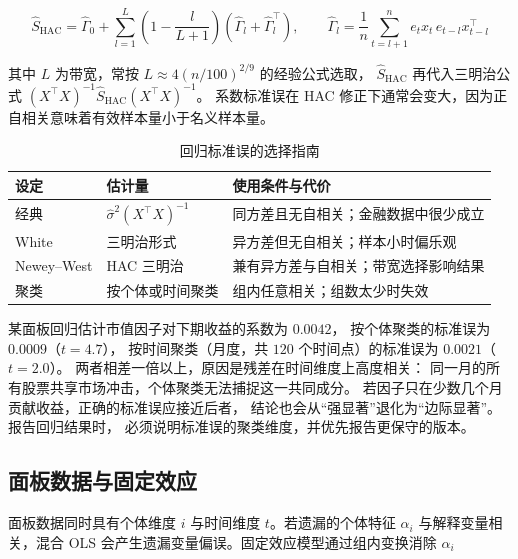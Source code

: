 \begin{equation}
  \hat{S}_{\text{HAC}} = \hat{\Gamma}_0 + \sum_{l=1}^{L}
  \left(1 - \frac{l}{L+1}\right)\left(\hat{\Gamma}_l + \hat{\Gamma}_l^{\top}\right),
  \qquad \hat{\Gamma}_l = \frac{1}{n}\sum_{t=l+1}^{n} e_t x_t\, e_{t-l} x_{t-l}^{\top}
  \label{eq:08-hac}
\end{equation}

其中 $L$ 为带宽，常按 $L \approx 4(n/100)^{2/9}$ 的经验公式选取，
$\hat{S}_{\text{HAC}}$ 再代入三明治公式
$(X^{\top}X)^{-1}\hat{S}_{\text{HAC}}(X^{\top}X)^{-1}$。
系数标准误在 HAC 修正下通常会变大，因为正自相关意味着有效样本量小于名义样本量。

\begin{table}[htbp]
\centering
\caption{回归标准误的选择指南}\label{tab:08-se}
\tablefont
\begin{tabular}{@{}llL{5.4cm}@{}}
\toprule
设定 & 估计量 & 使用条件与代价 \\
\midrule
经典 & $\hat{\sigma}^{2}(X^{\top}X)^{-1}$ & 同方差且无自相关；金融数据中很少成立 \\
White & 三明治形式 & 异方差但无自相关；样本小时偏乐观 \\
Newey--West & HAC 三明治 & 兼有异方差与自相关；带宽选择影响结果 \\
聚类 & 按个体或时间聚类 & 组内任意相关；组数太少时失效 \\
\bottomrule
\end{tabular}
\end{table}

\begin{example}[聚类标准误对显著性的影响]\label{ex:08-cluster}
某面板回归估计市值因子对下期收益的系数为 $0.0042$，
按个体聚类的标准误为 $0.0009$（$t = 4.7$），
按时间聚类（月度，共 $120$ 个时间点）的标准误为 $0.0021$（$t = 2.0$）。
两者相差一倍以上，原因是残差在时间维度上高度相关：
同一月的所有股票共享市场冲击，个体聚类无法捕捉这一共同成分。
若因子只在少数几个月贡献收益，正确的标准误应接近后者，
结论也会从“强显著”退化为“边际显著”。报告回归结果时，
必须说明标准误的聚类维度，并优先报告更保守的版本。
\end{example}

\subsection{面板数据与固定效应}

面板数据同时具有个体维度 $i$ 与时间维度 $t$。若遗漏的个体特征 $\alpha_i$
与解释变量相关，混合 OLS 会产生遗漏变量偏误。固定效应模型通过组内变换消除 $\alpha_i$

